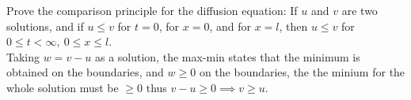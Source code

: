\newpage
Prove the comparison principle for the diffusion equation: If $u$ and $v$ are
two solutions, and if $u \leq  v$ for $t = 0$, for $x = 0$, and for $x = l$, then $u \leq   v$
for $0 \leq   t < \infty ,\ 0 \leq x \leq   l$.\\

Taking $w=v-u$ as a solution, the max-min states that the minimum is obtained on the boundaries, and $w \geq  0$ on the boundaries, the the minium for the whole solution must be $\geq  0$ thus $v-u \geq  0 \implies  v \geq  u$.


